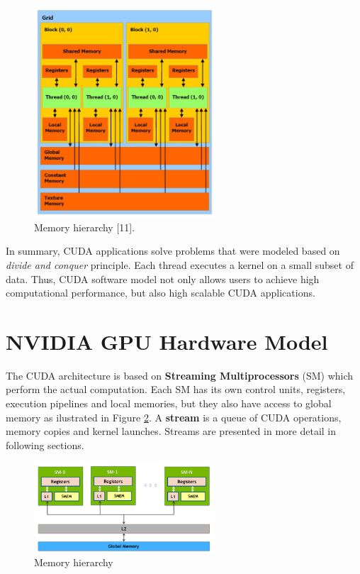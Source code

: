 \documentclass[
  12pt,
  a4paperpaper,
]{report}
\begin{document}
\begin{figure}
\centering
\includegraphics[width=0.6\textwidth,height=\textheight]{source/figures/sw_model_memory.png}
\caption{Memory hierarchy {[}11{]}. \label{img:sw_model_memory}}
\end{figure}

In summary, CUDA applications solve problems that were modeled based on
\emph{divide and conquer} principle. 
Each thread executes a kernel on a small subset of data.
Thus, CUDA software model not
only allows users to achieve high computational performance, but also
high scalable CUDA applications.

\hypertarget{nvidia-gpu-hardware-model}{%
\section{NVIDIA GPU Hardware Model}\label{nvidia-gpu-hardware-model}}

The CUDA architecture is based on \textbf{Streaming Multiprocessors}
(SM) which perform the actual computation. Each SM has its own control
units, registers, execution pipelines and local memories, but they also
have access to global memory as ilustrated in Figure
\ref{img:sm_memory}. A \textbf{stream} is a queue of CUDA operations,
memory copies and kernel launches. Streams are presented in more detail in 
following sections.

\begin{figure}
\centering
\includegraphics[width=0.6\textwidth,height=\textheight]{source/figures/sm_memory.png}
\caption{Memory hierarchy \label{img:sm_memory}}
\end{figure}
\end{document}
